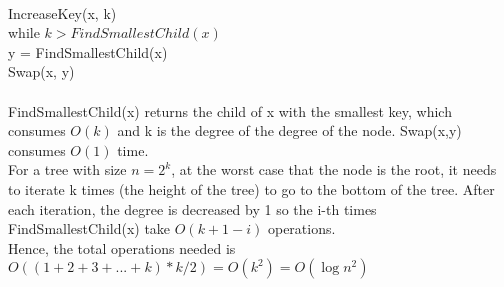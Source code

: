 \begin{problem}{3} ~\\
IncreaseKey(x, k)\\
while $k > FindSmallestChild(x)$ \\
\tab y = FindSmallestChild(x) \\
\tab Swap(x, y)\\
\\
FindSmallestChild(x) returns the child of x with the smallest key, which consumes $O(k)$ and k is the degree of the degree of the node. Swap(x,y) consumes $O(1)$ time. \\
For a tree with size $n=2^{k}$, at the worst case that the node is the root, it needs to iterate k times (the height of the tree) to go to the bottom of the tree. After each iteration, the degree is decreased by 1 so the i-th times FindSmallestChild(x) take $O(k+1-i)$ operations.\\
Hence, the total operations needed is $O((1+2+3+...+k)*k/2) = O(k^2) = O(\log{n}^2)$\\
\end{problem}